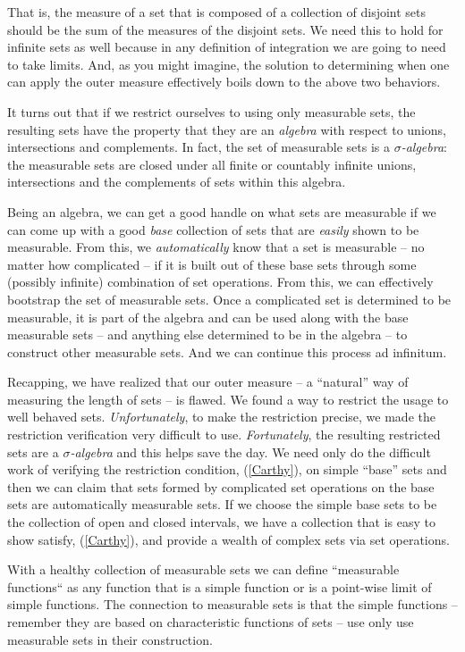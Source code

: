 \documentclass{article}
\begin{document}
That is, the measure of a set that is composed of a collection of disjoint 
sets should be the sum of the measures of the disjoint sets. We need this to hold
for infinite sets as well because in any definition of integration we are going 
to need to take limits.
And, as you might imagine, the solution to determining when one can apply the 
outer measure effectively boils down to the above two behaviors.

It turns out that if we restrict ourselves to using only measurable sets, 
the resulting sets have the property that they are an 
{\em algebra\/} with respect to unions, intersections and complements. 
In fact, the set of measurable sets is a {\em $\sigma$-algebra\/}:
the measurable sets are closed under all finite or countably infinite unions, 
intersections and the complements of sets within this algebra.

Being an algebra, we can get a good handle on what sets are measurable if we 
can come up with a good {\em base\/} collection of sets that are {\em easily\/} shown
to be measurable. From this, we {\em automatically\/} know that a set is measurable 
-- no matter how complicated -- if it is built out of these base sets
through some (possibly infinite) combination of set operations.
From this, we can effectively bootstrap the set of measurable sets.
Once a complicated set is determined to be measurable, it is part of the 
algebra and can be used along with the base measurable sets -- and anything 
else determined to be in the algebra -- to construct other measurable sets. 
And we can continue this process ad infinitum.

Recapping, we have realized that our outer measure -- a ``natural'' way of 
measuring the length of sets -- is flawed. We found a way to restrict the 
usage to well behaved sets. {\em Unfortunately\/}, to make the restriction precise, 
we made the restriction verification very difficult to use. {\em Fortunately\/}, 
the resulting restricted sets are a {\em $\sigma$-algebra\/} and this helps 
save the day. We need only do the difficult work of verifying the restriction 
condition, (\ref{Carthy}), on simple ``base'' sets and then we can claim that 
sets formed by complicated set operations on the base sets are automatically 
measurable sets. If we choose the simple base sets 
to be the collection of open and closed intervals, we have a collection that 
is easy to show satisfy, (\ref{Carthy}), and provide a wealth of complex sets
via set operations.

With a healthy collection of measurable sets we can define ``measurable functions``
as any function that is a simple function or is a point-wise limit of simple functions.
The connection to measurable sets is that the simple functions -- remember they 
are based on characteristic functions of sets -- use only use measurable sets in 
their construction.
\end{document}

